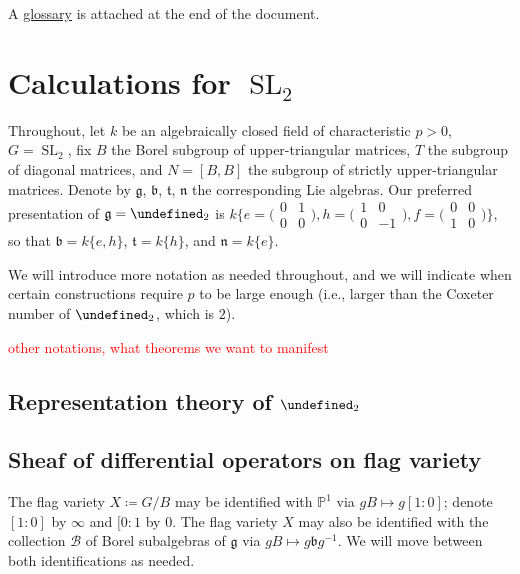 \documentclass[11pt,leqno]{article}
\newcommand{\sai}[1]{\textcolor{red}{#1}}
\theoremstyle{plain}
\theoremstyle{definition}
\numberwithin{equation}{section}
\numberwithin{lem}{section}
\let\sl\undefined
\DeclareMathOperator{\sl}{\mathfrak{sl}}
\DeclareMathOperator{\SL}{SL}
\begin{document}
A \hyperref[glossary]{glossary} is attached at the end of the document.\newpage

\section*{Calculations for $\SL_2$}
Throughout, let $k$ be an algebraically closed field of characteristic $p>0$, $G = \SL_2$, fix $B$ the Borel subgroup of upper-triangular matrices, $T$ the subgroup of diagonal matrices, and $N = [B,B]$ the subgroup of strictly upper-triangular matrices. Denote by $\mathfrak g$, $\mathfrak b$, $\mathfrak t$, $\mathfrak n$ the corresponding Lie algebras. Our preferred presentation of $\mathfrak g= \sl_2$ is $k\{e = \bigl(\!\begin{smallmatrix}
	0 & 1 \\ 0 & 0
\end{smallmatrix}\!\bigr), h = \bigl(\!\begin{smallmatrix}
	1 & 0 \\ 0 & -1
\end{smallmatrix}\!\bigr), f = \bigl(\!\begin{smallmatrix}
	0 & 0 \\ 1 & 0
\end{smallmatrix}\!\bigr)\}$, so that $\mathfrak b = k\{e,h\}$, $\mathfrak t = k\{h\}$, and $\mathfrak n = k\{e\}$.

We will introduce more notation as needed throughout, and we will indicate when certain constructions require $p$ to be large enough (i.e., larger than the Coxeter number of $\sl_2$, which is $2$).

\sai{other notations, what theorems we want to manifest}
\subsection{Representation theory of $\sl_2$}
\subsection{Sheaf of differential operators on flag variety}
The flag variety $X\coloneqq G/B$ may be identified with $\mathbb P^1$ via $gB\mapsto g[1:0]$; denote $[1:0]$ by $\infty$ and $[0:1$ by $0$. The flag variety $X$ may also be identified with the collection $\mathcal B$ of Borel subalgebras of $\mathfrak g$ via $gB\mapsto g\mathfrak b g^{-1}$. We will move between both identifications as needed.
\end{document}
